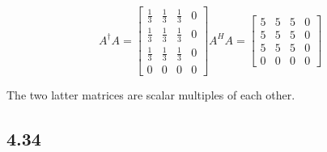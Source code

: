 \documentclass[letterpaper,12pt]{article}
\theoremstyle{definition}
\begin{document}
\[A^{\dag}A = 
\begin{bmatrix}
\frac{1}{3}&\frac{1}{3}&\frac{1}{3} &0\\
\frac{1}{3}&\frac{1}{3}&\frac{1}{3} &0\\
\frac{1}{3}&\frac{1}{3}&\frac{1}{3}&0\\
0&0&0&0
\end{bmatrix} A^HA =  
\begin{bmatrix}
5 & 5&5&0\\
5&5&5 & 0\\
5&5&5&0\\
0&0&0&0
\end {bmatrix}
\]

The two latter matrices are scalar multiples of each other.

\subsection*{4.34}
\end{document}
